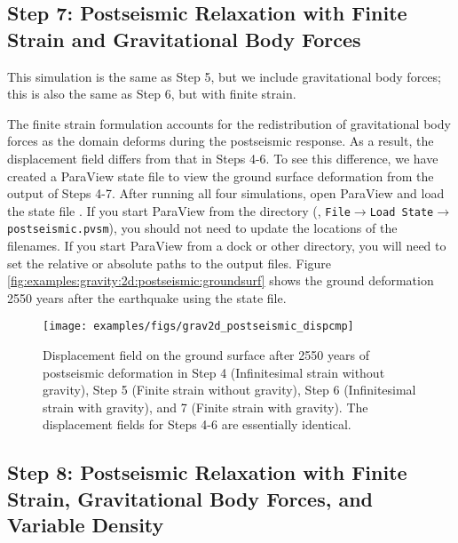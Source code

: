 \subsection{Step 7: Postseismic Relaxation with Finite Strain and Gravitational Body Forces}

This simulation is the same as Step 5, but we include gravitational
body forces; this is also the same as Step 6, but with finite strain.

The finite strain formulation accounts for the redistribution of
gravitational body forces as the domain deforms during the postseismic
response.  As a result, the displacement field differs from that in
Steps 4-6.  To see this difference, we have created a ParaView state
file to view the ground surface deformation from the output of Steps
4-7. After running all four simulations, open ParaView and load the
state file . If you start ParaView from the
 directory
(,
\texttt{File$\rightarrow$Load State$\rightarrow$postseismic.pvsm}),
you should not need to update the locations of the filenames. If you
start ParaView from a dock or other directory, you will need to set
the relative or absolute paths to the output files. Figure
\vref{fig:examples:gravity:2d:postseismic:groundsurf} shows the ground
deformation 2550 years after the earthquake using the state file.

\begin{figure}
  \texttt{[image: examples/figs/grav2d\_postseismic\_dispcmp]}
  \caption{Displacement field on the ground surface after 2550 years
    of postseismic deformation in Step 4 (Infinitesimal strain without
    gravity), Step 5 (Finite strain without gravity), Step 6
    (Infinitesimal strain with gravity), and 7 (Finite strain with
    gravity). The displacement fields for Steps 4-6 are essentially
    identical.}
  \label{fig:examples:gravity:2d:postseismic:groundsurf}
\end{figure}


\subsection{Step 8: Postseismic Relaxation with Finite Strain, Gravitational
Body Forces, and Variable Density}

